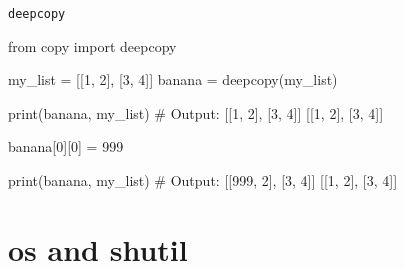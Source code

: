 \begin{frame}[fragile]{\texttt{deepcopy}}

    \begin{pythoncode}

from copy import deepcopy

my_list = [[1, 2], [3, 4]]
banana = deepcopy(my_list)

print(banana, my_list)
# Output: [[1, 2], [3, 4]] [[1, 2], [3, 4]]

banana[0][0] = 999

print(banana, my_list)
# Output: [[999, 2], [3, 4]] [[1, 2], [3, 4]]

    \end{pythoncode}


\end{frame}


\section{os and shutil}

\begin{frame}[plain]
    \sectionpage
\end{frame}


